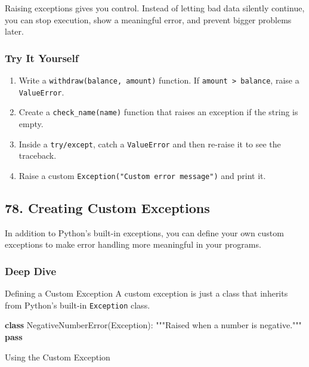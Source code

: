 \documentclass[
  letterpaper,
  DIV=11,
  numbers=noendperiod]{scrreprt}
\newenvironment{Shaded}{\begin{snugshade}}{\end{snugshade}}
\newcommand{\CommentTok}[1]{\textcolor[rgb]{0.37,0.37,0.37}{#1}}
\newcommand{\ControlFlowTok}[1]{\textcolor[rgb]{0.00,0.23,0.31}{\textbf{#1}}}
\newcommand{\KeywordTok}[1]{\textcolor[rgb]{0.00,0.23,0.31}{\textbf{#1}}}
\newcommand{\NormalTok}[1]{\textcolor[rgb]{0.00,0.23,0.31}{#1}}
\newcommand{\PreprocessorTok}[1]{\textcolor[rgb]{0.68,0.00,0.00}{#1}}
\providecommand{\tightlist}{%
  \setlength{\itemsep}{0pt}\setlength{\parskip}{0pt}}
\begin{document}
Raising exceptions gives you control. Instead of letting bad data
silently continue, you can stop execution, show a meaningful error, and
prevent bigger problems later.

\subsubsection{Try It Yourself}\label{try-it-yourself-76}

\begin{enumerate}
\def\labelenumi{\arabic{enumi}.}
\tightlist
\item
  Write a \texttt{withdraw(balance,\ amount)} function. If
  \texttt{amount\ \textgreater{}\ balance}, raise a \texttt{ValueError}.
\item
  Create a \texttt{check\_name(name)} function that raises an exception
  if the string is empty.
\item
  Inside a \texttt{try/except}, catch a \texttt{ValueError} and then
  re-raise it to see the traceback.
\item
  Raise a custom \texttt{Exception("Custom\ error\ message")} and print
  it.
\end{enumerate}

\subsection{78. Creating Custom
Exceptions}\label{creating-custom-exceptions}

In addition to Python's built-in exceptions, you can define your own
custom exceptions to make error handling more meaningful in your
programs.

\subsubsection{Deep Dive}\label{deep-dive-77}

Defining a Custom Exception A custom exception is just a class that
inherits from Python's built-in \texttt{Exception} class.

\begin{Shaded}
\begin{Highlighting}[]
\KeywordTok{class}\NormalTok{ NegativeNumberError(}\PreprocessorTok{Exception}\NormalTok{):}
    \CommentTok{"""Raised when a number is negative."""}
    \ControlFlowTok{pass}
\end{Highlighting}
\end{Shaded}

Using the Custom Exception
\end{document}
